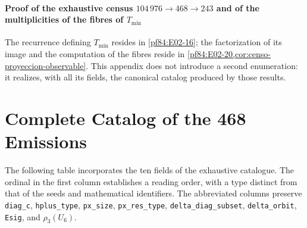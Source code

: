 \paragraph{Proof of the exhaustive census \(104\,976\to468\to243\) and of the multiplicities of the fibres of \(T_{\min}\)}
The recurrence defining \(T_{\min}\) resides in
\cref{pf84:E02-16}; the factorization of its image and the computation of the fibres reside
in \cref{pf84:E02-20,cor:censo-proyeccion-observable}. This appendix does not
introduce a second enumeration: it realizes, with all its fields, the
canonical catalog produced by those results.

\section{Complete Catalog of the 468 Emissions}

The following table incorporates the ten fields of the exhaustive catalogue. The ordinal in the first column establishes a reading order, with a type distinct from that of the seeds and mathematical identifiers. The abbreviated columns preserve \texttt{diag\_c}, \texttt{hplus\_type}, \texttt{px\_size}, \texttt{px\_res\_type}, \texttt{delta\_diag\_subset}, \texttt{delta\_orbit}, \texttt{Esig}, and \(\rho_3(U_6)\).

